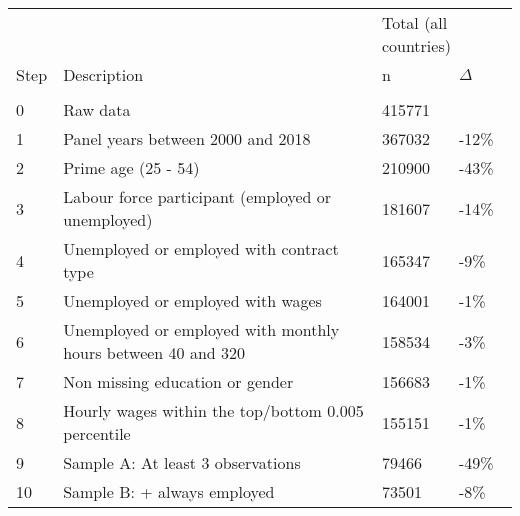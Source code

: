 \begin{tabular}{llll}
   \toprule 
 
&  & 
\multicolumn{2}{l}{Total (all countries)}
\\  
 
 
\multicolumn{1}{l}{Step} & 
\multicolumn{1}{l}{Description} 
& n & $\Delta$
\\ 
\cmidrule(lr){1-2}
\cmidrule(lr){3-4}
\\[-1.8ex]  
 
0 & Raw data & 415771 &  \\ 
  1 & Panel years between 2000 and 2018 & 367032 & -12\% \\ 
  2 & Prime age (25 - 54) & 210900 & -43\% \\ 
  3 & Labour force participant (employed or unemployed) & 181607 & -14\% \\ 
  4 & Unemployed or employed with contract type & 165347 & -9\% \\ 
  5 & Unemployed or employed with wages & 164001 & -1\% \\ 
  6 & Unemployed or employed with monthly hours between 40 and 320 & 158534 & -3\% \\ 
  7 & Non missing education or gender & 156683 & -1\% \\ 
  8 & Hourly wages within the top/bottom 0.005 percentile & 155151 & -1\% \\ 
  9 & Sample A: At least 3 observations & 79466 & -49\% \\ 
  10 & Sample B: + always employed & 73501 & -8\% \\ 
   \bottomrule 
\end{tabular}
